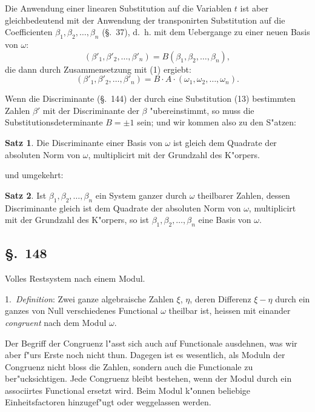 \documentclass[12pt,a4paper]{article}
\theoremstyle{definition}
\newtheorem*{satz}{Satz}
\begin{document}
Die Anwendung einer linearen Substitution auf die Variablen $t$ ist aber gleichbedeutend mit der Anwendung der transponirten Substitution auf die Coefficienten $\beta_1, \beta_2, \dots, \beta_n$ (\S.~37), d.~h. mit dem Uebergange zu einer neuen Basis von $\omega$:
\begin{equation}
(\beta'_1, \beta'_2, \dots, \beta'_n) = B(\beta_1, \beta_2, \dots, \beta_n),
\end{equation}
die dann durch Zusammensetzung mit (1) ergiebt:
\begin{equation}
(\beta'_1, \beta'_2, \dots, \beta'_n) = B \cdot A \cdot (\omega_1, \omega_2, \dots, \omega_n).
\end{equation}

Wenn die Discriminante (\S.~144) der durch eine Substitution (13) bestimmten Zahlen $\beta'$ mit der Discriminante der $\beta$ "ubereinstimmt, so muss die Substitutionsdeterminante $B = \pm 1$ sein; und wir kommen also zu den S"atzen:

\begin{satz}
Die Discriminante einer Basis von $\omega$ ist gleich dem Quadrate der absoluten Norm von $\omega$, multiplicirt mit der Grundzahl des K"orpers.
\end{satz}

und umgekehrt:

\begin{satz}
Ist $\beta_1, \beta_2, \dots, \beta_n$ ein System ganzer durch $\omega$ theilbarer Zahlen, dessen Discriminante gleich ist dem Quadrate der absoluten Norm von $\omega$, multiplicirt mit der Grundzahl des K"orpers, so ist $\beta_1, \beta_2, \dots, \beta_n$ eine Basis von $\omega$.
\end{satz}


\subsection*{\S.~148}

Volles Restsystem nach einem Modul.

1.~\emph{Definition}: Zwei ganze algebraische Zahlen $\xi$, $\eta$, deren Differenz $\xi - \eta$ durch ein ganzes von Null verschiedenes Functional $\omega$ theilbar ist, heissen mit einander \emph{congruent} nach dem Modul $\omega$.

Der Begriff der Congruenz l"asst sich auch auf Functionale ausdehnen, was wir aber f"urs Erste noch nicht thun. Dagegen ist es wesentlich, als Moduln der Congruenz nicht bloss die Zahlen, sondern auch die Functionale zu ber"ucksichtigen. Jede Congruenz bleibt bestehen, wenn der Modul durch ein associirtes Functional ersetzt wird. Beim Modul k"onnen beliebige Einheitsfactoren hinzugef"ugt oder weggelassen werden.
\end{document}
